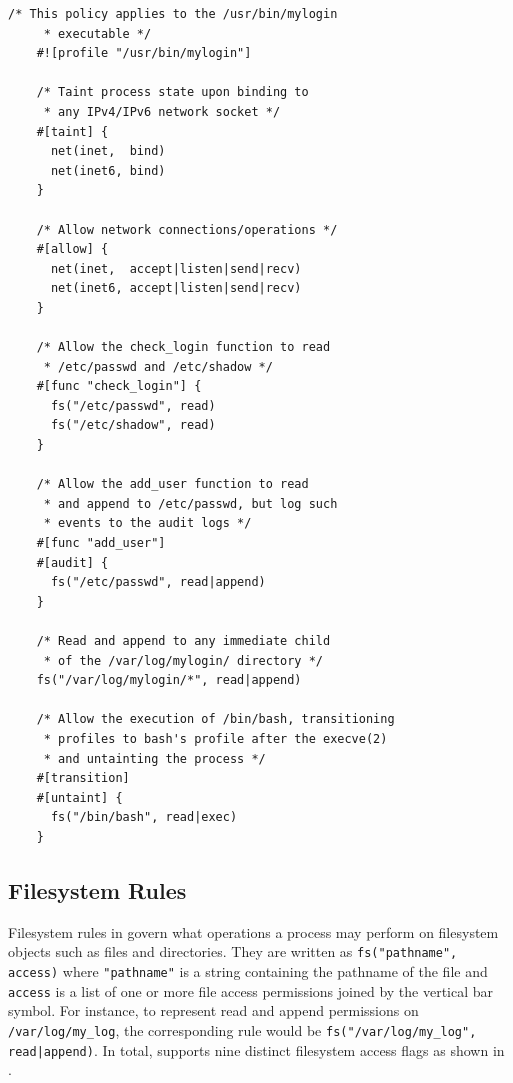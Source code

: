 \begin{lstlisting}[language=bpfbox, gobble=4,
  caption={[An example \bpfbox{} policy]
    An example \bpfbox{} policy for a simple remote login program. This example offers
    a fairly complete idea of the \bpfbox{} policy language's various features.
  },
  label={lst:bpfbox-policy-example}, float]
    /* This policy applies to the /usr/bin/mylogin
     * executable */
    #![profile "/usr/bin/mylogin"]

    /* Taint process state upon binding to
     * any IPv4/IPv6 network socket */
    #[taint] {
      net(inet,  bind)
      net(inet6, bind)
    }

    /* Allow network connections/operations */
    #[allow] {
      net(inet,  accept|listen|send|recv)
      net(inet6, accept|listen|send|recv)
    }

    /* Allow the check_login function to read
     * /etc/passwd and /etc/shadow */
    #[func "check_login"] {
      fs("/etc/passwd", read)
      fs("/etc/shadow", read)
    }

    /* Allow the add_user function to read
     * and append to /etc/passwd, but log such
     * events to the audit logs */
    #[func "add_user"]
    #[audit] {
      fs("/etc/passwd", read|append)
    }

    /* Read and append to any immediate child
     * of the /var/log/mylogin/ directory */
    fs("/var/log/mylogin/*", read|append)

    /* Allow the execution of /bin/bash, transitioning
     * profiles to bash's profile after the execve(2)
     * and untainting the process */
    #[transition]
    #[untaint] {
      fs("/bin/bash", read|exec)
    }
\end{lstlisting}



\subsection{Filesystem Rules}%
\label{ss:bpfbox-filesystem-rules}

Filesystem rules in \bpfbox{} govern what operations a process may perform on filesystem
objects such as files and directories. They are written as
\lstinline[language=bpfbox]{fs("pathname", access)} where
\lstinline[language=bpfbox]{"pathname"} is a string containing the pathname of the file
and \lstinline[language=bpfbox]{access} is a list of one or more file access permissions
joined by the vertical bar symbol.  For instance, to represent read and
append permissions on \texttt{/var/log/my\_log}, the corresponding \bpfbox{} rule would be
\lstinline[language=bpfbox]{fs("/var/log/my_log", read|append)}.  In total, \bpfbox{}
supports nine distinct filesystem access flags as shown in .

